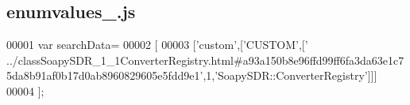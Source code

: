 \subsection{enumvalues\+\_.\+js}
\label{enumvalues__1_8js_source}

\begin{DoxyCode}
00001 var searchData=
00002 [
00003   [\textcolor{stringliteral}{'custom'},[\textcolor{stringliteral}{'CUSTOM'},[\textcolor{stringliteral}{'
      ../classSoapySDR\_1\_1ConverterRegistry.html#a93a150b8e96ffd99ff6fa3da63e1c75da8b91af0b17d0ab8960829605e5fdd9e1'},1,\textcolor{stringliteral}{'SoapySDR::ConverterRegistry'}]]]
00004 ];
\end{DoxyCode}
